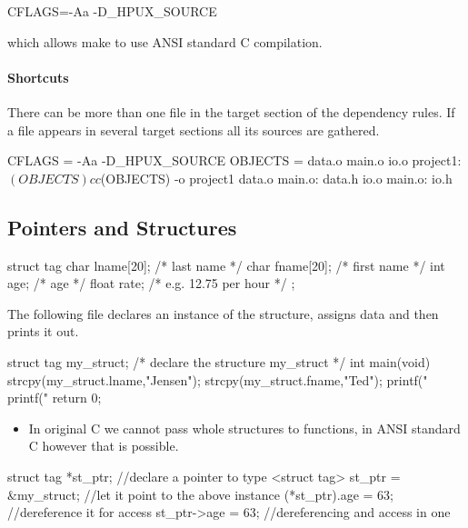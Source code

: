 \documentclass[10pt,a4paper]{scrartcl}
\begin{document}
\begin{multicols*}{2}
\begin{TPCpp}
CFLAGS=-Aa -D_HPUX_SOURCE
\end{TPCpp}

which allows make to use ANSI standard C compilation.

\paragraph{Shortcuts}

There can be more than one file in the target section of the dependency rules. If a file appears in several target sections all its sources are gathered.

\begin{TPCpp}
CFLAGS = -Aa -D_HPUX_SOURCE
OBJECTS = data.o main.o io.o
project1: $(OBJECTS)
	cc $(OBJECTS) -o project1
data.o main.o: data.h
io.o main.o: io.h
\end{TPCpp}

\subsection{Pointers and Structures}

\begin{TPCpp}
struct tag {
	char lname[20]; /* last name */
	char fname[20]; /* first name */
	int age; /* age */
	float rate; /* e.g. 12.75 per hour */
};
\end{TPCpp}

The following file declares an instance of the structure, assigns data and then prints it out.

\begin{TPCpp}
struct tag my_struct; /* declare the structure my_struct */
int main(void)
{
strcpy(my_struct.lname,"Jensen");
strcpy(my_struct.fname,"Ted");
printf("\n%
printf("%
return 0;
}
\end{TPCpp}

\begin{itemize}
\item In original C we cannot pass whole structures to functions, in ANSI standard C however that is possible.
\end{itemize}

\begin{TPCpp}
struct tag *st_ptr; //declare a pointer to type <struct tag>
st_ptr = &my_struct; //let it point to the above instance
(*st_ptr).age = 63; //dereference it for access
st_ptr->age = 63; //dereferencing and access in one
\end{TPCpp}


\end{multicols*}
\end{document}

